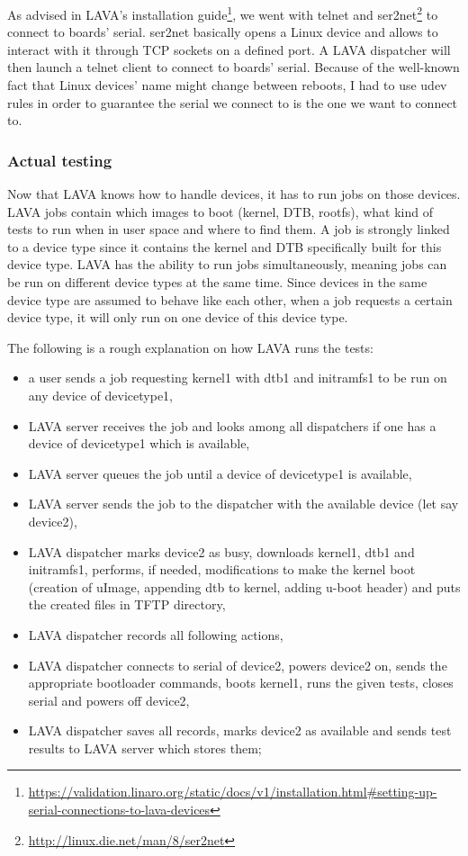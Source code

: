 As advised in LAVA's installation guide\footnote{\url{https://validation.linaro.org/static/docs/v1/installation.html\#setting-up-serial-connections-to-lava-devices}}, we went with telnet and ser2net\footnote{\url{http://linux.die.net/man/8/ser2net}} to connect to boards' serial. ser2net basically opens a Linux device and allows to interact with it through TCP sockets on a defined port. A LAVA dispatcher will then launch a telnet client to connect to boards' serial. Because of the well-known fact that Linux devices' name might change between reboots, I had to use udev rules in order to guarantee the serial we connect to is the one we want to connect to.

\subsubsection{Actual testing}

Now that LAVA knows how to handle devices, it has to run jobs on those devices. LAVA jobs contain which images to boot (kernel, DTB, rootfs), what kind of tests to run when in user space and where to find them. A job is strongly linked to a device type since it contains the kernel and DTB specifically built for this device type. LAVA has the ability to run jobs simultaneously, meaning jobs can be run on different device types at the same time. Since devices in the same device type are assumed to behave like each other, when a job requests a certain device type, it will only run on one device of this device type.

The following is a rough explanation on how LAVA runs the tests:
\begin{itemize}
  \item a user sends a job requesting kernel1 with dtb1 and initramfs1 to be run on any device of devicetype1,
  \item LAVA server receives the job and looks among all dispatchers if one has a device of devicetype1 which is available,
  \item LAVA server queues the job until a device of devicetype1 is available,
  \item LAVA server sends the job to the dispatcher with the available device (let say device2),
  \item LAVA dispatcher marks device2 as busy, downloads kernel1, dtb1 and initramfs1, performs, if needed, modifications to make the kernel boot (creation of uImage, appending dtb to kernel, adding u-boot header) and puts the created files in TFTP directory,
  \item LAVA dispatcher records all following actions,
  \item LAVA dispatcher connects to serial of device2, powers device2 on, sends the appropriate bootloader commands, boots kernel1, runs the given tests, closes serial and powers off device2,
  \item LAVA dispatcher saves all records, marks device2 as available and sends test results to LAVA server which stores them;
\end{itemize}

